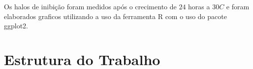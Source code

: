 Os halos de inibição foram medidos após o crecimento de $24$ horas a $30$\textdegree$C$
e foram elaborados graficos utilizando a uso da ferramenta R com o uso do pacote ggplot2.

\section{Estrutura do Trabalho}



